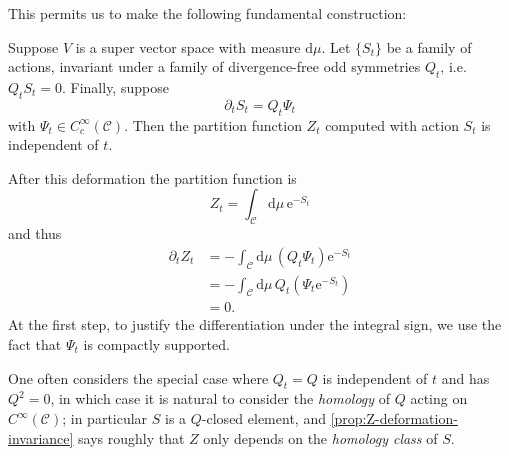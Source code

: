 \documentclass[12pt,letterpaper,reqno]{article}
\numberwithin{equation}{section}
\newcommand{\cC}{\ensuremath{\mathcal C}}
\newcommand{\e}{{\mathrm e}}
\newcommand{\de}{\mathrm{d}}
\newcommand{\IP}[1]{\langle#1\rangle}
\newcommand{\ti}[1]{\textit{#1}}
\begin{document}
This permits us to make the following fundamental construction:
\begin{prop} \label{prop:Z-deformation-invariance}
Suppose $V$ is a super vector space with measure $\de \mu$.
Let $\{S_t\}$ be a family of actions,
invariant under a family of divergence-free odd symmetries $Q_t$,
i.e. $Q_t S_t = 0$.
Finally, suppose
\begin{equation}
  \partial_t S_t = Q_t \Psi_t
\end{equation}
with $\Psi_t \in C^\infty_c(\cC)$. 
Then the partition function $Z_t$ computed with action $S_t$
is independent of $t$.
\end{prop}

\begin{pf}
After this deformation the partition function is
\begin{equation}
  Z_t = \int_\cC \de \mu \, \e^{-S_t}
\end{equation}
and thus
\begin{align}
  \partial_t Z_t &= -\int_\cC \de \mu \, (Q_t \Psi_t) \e^{-S_t} \\
  &= -\int_\cC \de \mu \, Q_t \left( \Psi_t \e^{-S_t} \right) \\
  &= 0.
\end{align}
At the first step, to justify the differentiation under the 
integral sign, we use the fact that $\Psi_t$ is compactly supported.
\end{pf}

One often considers the special case where 
$Q_t = Q$ is independent of $t$ and 
has $Q^2 = 0$, in which case it is natural to consider
the \ti{homology} of $Q$ acting on $C^\infty(\cC)$;
in particular $S$ is a $Q$-closed element, and \autoref{prop:Z-deformation-invariance}
says roughly that $Z$ only depends on the \ti{homology class} of $S$.
\end{document}
